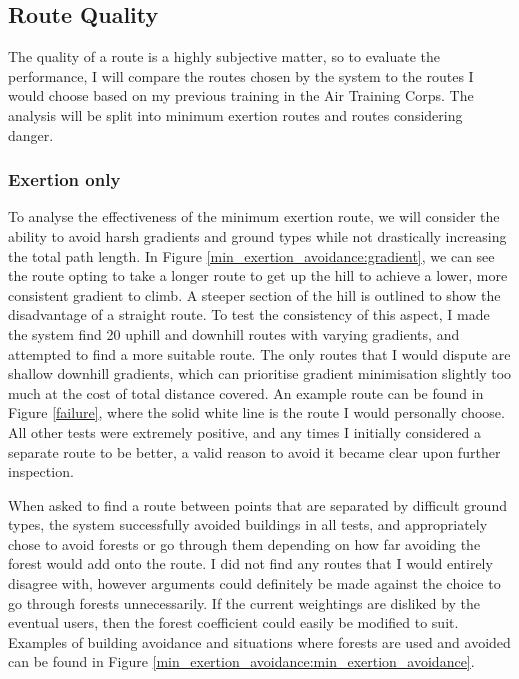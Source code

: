 \documentclass[12pt,a4paper]{article}
\begin{document}
  \subsection{Route Quality}
  \noindent The quality of a route is a highly subjective matter, so to evaluate the performance, I will compare the routes chosen by the system to the routes I would choose based on my previous training in the Air Training Corps. The analysis will be split into minimum exertion routes and routes considering danger.

  \subsubsection{Exertion only}
  To analyse the effectiveness of the minimum exertion route, we will consider the ability to avoid harsh gradients and ground types while not drastically increasing the total path length. In Figure \ref{min_exertion_avoidance:gradient}, we can see the route opting to take a longer route to get up the hill to achieve a lower, more consistent gradient to climb. A steeper section of the hill is outlined to show the disadvantage of a straight route. To test the consistency of this aspect, I made the system find 20 uphill and downhill routes with varying gradients, and attempted to find a more suitable route. The only routes that I would dispute are shallow downhill gradients, which can prioritise gradient minimisation slightly too much at the cost of total distance covered. An example route can be found in Figure \ref{failure}, where the solid white line is the route I would personally choose. All other tests were extremely positive, and any times I initially considered a separate route to be better, a valid reason to avoid it became clear upon further inspection.
  \par When asked to find a route between points that are separated by difficult ground types, the system successfully avoided buildings in all tests, and appropriately chose to avoid forests or go through them depending on how far avoiding the forest would add onto the route. I did not find any routes that I would entirely disagree with, however arguments could definitely be made against the choice to go through forests unnecessarily. If the current weightings are disliked by the eventual users, then the forest coefficient could easily be modified to suit. Examples of building avoidance and situations where forests are used and avoided can be found in Figure \ref{min_exertion_avoidance:min_exertion_avoidance}.
\end{document}
